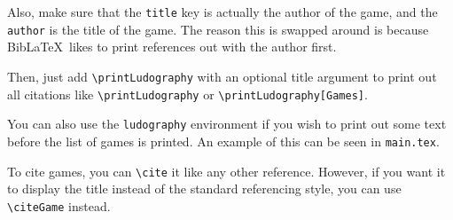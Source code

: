 Also, make sure that the \texttt{title} key is actually the author of the game, and the \texttt{author} is the title of the game. The reason this is swapped around is because Bib\LaTeX~likes to print references out with the author first.

Then, just add \texttt{\textbackslash printLudography} with an optional title argument to print out all citations like \texttt{\textbackslash printLudography} or \texttt{\textbackslash printLudography[Games]}.

You can also use the \texttt{ludography} environment if you wish to print out some text before the list of games is printed. An example of this can be seen in \texttt{main.tex}.

To cite games, you can \texttt{\textbackslash cite} it like any other reference. However, if you want it to display the title instead of the standard referencing style, you can use \texttt{\textbackslash citeGame} instead.
